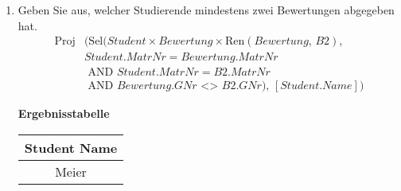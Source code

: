 \begin{enumerate}
    \item Geben Sie aus, welcher Studierende mindestens zwei Bewertungen abgegeben hat.
        \begin{align*}
            \text{Proj}&\bigl(
            \text{Sel}(Student \times Bewertung \times \text{Ren}(Bewertung,\, B2), \\ 
            &Student.MatrNr=Bewertung.MatrNr\\
            &\text{ AND } Student.MatrNr = B2.MatrNr\\
            & \text{ AND } Bewertung.GNr \text{ <> } B2.GNr),\, [Student.Name]
            \bigr)
        \end{align*}

        \begin{table}[H]
            \centering
            \textbf{Ergebnisstabelle} \\ [3pt]
            \begin{tabular}{|c|}
                \hline
                \textbf{Student Name}\\
                \hline
                Meier \\
                \hline  
            \end{tabular}
        \end{table}

\end{enumerate}
